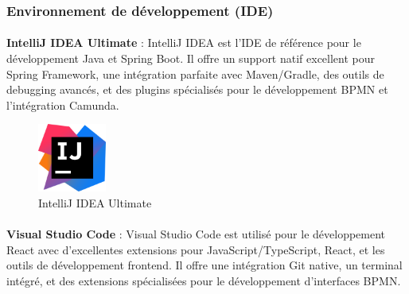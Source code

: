 \subsubsection{Environnement de développement (IDE)}

\paragraph{}{
\begin{dinglist}{80}
    
    \item \textbf{IntelliJ IDEA Ultimate} : IntelliJ IDEA est l'IDE de référence pour le développement Java et Spring Boot. Il offre un support natif excellent pour Spring Framework, une intégration parfaite avec Maven/Gradle, des outils de debugging avancés, et des plugins spécialisés pour le développement BPMN et l'intégration Camunda.
    
    \begin{figure}[H]
        \centering
        \includegraphics[width=0.2\textwidth]{Images/intelliJ.png}
        \caption{IntelliJ IDEA Ultimate}
        \label{fig:intellij}
    \end{figure}
\end{dinglist}}

\paragraph{}{
\begin{dinglist}{80}
    
    \item \textbf{Visual Studio Code} : Visual Studio Code est utilisé pour le développement React avec d'excellentes extensions pour JavaScript/TypeScript, React, et les outils de développement frontend. Il offre une intégration Git native, un terminal intégré, et des extensions spécialisées pour le développement d'interfaces BPMN.
    
\end{dinglist}}


